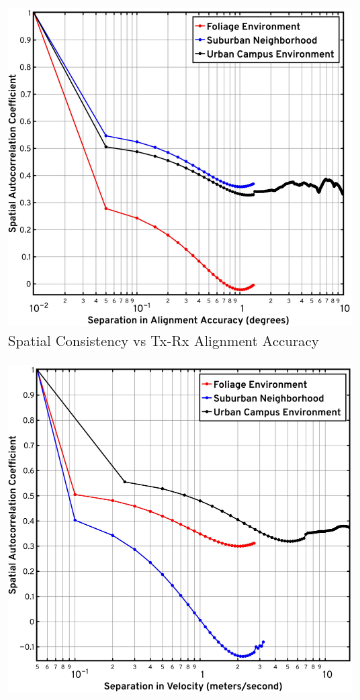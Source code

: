 \documentclass[12pt, draftcls, onecolumn]{IEEEtran}
\begin{document}
{\begin{figure} [t]
     \begin{subfigure}{0.5015\linewidth}
         \centering
         \includegraphics[width=1.0\linewidth]{figs/spatial_consistency_vs_alignment.pdf}
         \caption{Spatial Consistency vs Tx-Rx Alignment Accuracy}
         \label{F8a}
     \end{subfigure}
     \begin{subfigure}{0.4885\linewidth}
         \centering
         \includegraphics[width=1.0\linewidth]{figs/spatial_consistency_vs_velocity.pdf}

\end{subfigure}
\end{figure}}
\end{document}
